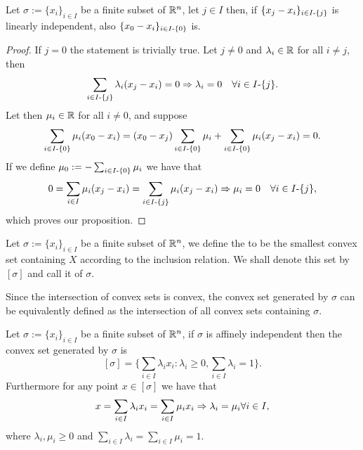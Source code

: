 \documentclass[../1.tex]{subfiles}
\begin{document}
    \begin{prop}
        Let $\sigma := \{x_i\}_{i \in I}$ be a finite subset of $\mathbb{R}^n$, let $j \in I$ then, if $\{ x_j - x_i\}_{i \in I \text{-} \{j\}}$ is linearly independent,
        also $\{ x_0 - x_i\}_{i \in I \text{-} \{0\}}$ is. 
    \end{prop}
    \begin{proof}
        If $j=0$ the statement is trivially true. Let $j \neq 0$ and $\lambda_i \in \mathbb{R}$ for all $i \neq j$, then
        \[ \sum_{i \in I \text{-} \{j\}} \lambda_i (x_j - x_i) = 0 \Rightarrow \lambda_i = 0 \quad \forall i \in I \text{-} \{j\}.\]
        Let then $\mu_i \in \mathbb{R}$ for all $i \neq 0$, and suppose 
        \[ \sum_{i \in I \text{-} \{0\}} \mu_i (x_0 - x_i) = (x_0 - x_j) \sum_{i \in I \text{-} \{0\}} \mu_i + \sum_{i \in I \text{-} \{0\}} \mu_i (x_j - x_i) = 0.\]
        If we define $\mu_0 := -\sum_{i \in I \text{-} \{0\}} \mu_i$ we have that
        \[ 0 = \sum_{i \in I} \mu_i (x_j - x_i) = \sum_{i \in I \text{-} \{j\}} \mu_i (x_j - x_i) \Rightarrow \mu_i = 0 \quad \forall i \in I \text{-} \{j\},\]
        which proves our proposition. \qedhere
    \end{proof}

    \begin{defn}
        Let $\sigma := \{x_i\}_{i \in I}$ be a finite subset of $\mathbb{R}^n$, we define the  to be 
        the smallest convex set containing $X$ according to the inclusion relation. We shall denote this set by $[\sigma]$ and call 
        it  of $\sigma$.
    \end{defn}

    Since the intersection of convex sets is convex, the convex set generated by $\sigma$ can be equivalently defined as the intersection 
    of all convex sets containing $\sigma$.

    \begin{thm}
        Let $\sigma := \{x_i\}_{i \in I}$ be a finite subset of $\mathbb{R}^n$, if $\sigma$ is affinely independent then the convex set generated by $\sigma$ is 
        \[ [\sigma] = \{ \sum_{i \in I} \lambda_i x_i : \lambda_i \geq 0, \sum_{i \in I} \lambda_i = 1\}. \]
        Furthermore for any point $x \in [\sigma]$ we have that
        \[ x = \sum_{i \in I} \lambda_i x_i = \sum_{i \in I} \mu_i x_i \Rightarrow \lambda_i = \mu_i \forall i \in I, \] 
        where $\lambda_i,\mu_i \geq 0$ and $\sum_{i \in I} \lambda_i = \sum_{i \in I} \mu_i =1$.
        \label{thm:1}
    \end{thm}
\end{document}
